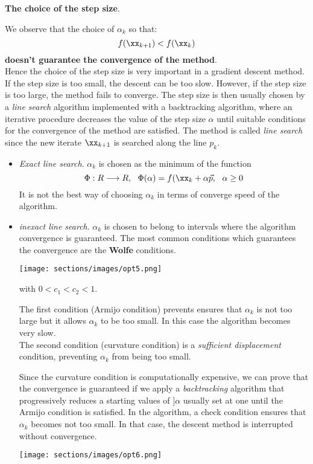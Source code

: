 \textbf{The choice of the step size}.

We observe that the choice of $\alpha_k$ so that:
$$f(\xx_{k+1})<f(\xx_k)$$ 
\textbf{doesn't guarantee the convergence of the method}.\\
Hence the choice of the step size is very important in a gradient descent method. If the step size is too small, the descent can be too slow. However, if the step size is too large, the method fails to converge. The step size is then usually chosen by a \textit{line search} algorithm implemented with a backtracking algorithm, where an iterative procedure decreases the value of the step size $\alpha$ until suitable conditions for the convergence of the method are satisfied. The method is called \textit{line search} since the new iterate $\xx_{k+1}$ is searched along the line $p_k$.

\begin{itemize}
    \item \textit{Exact line search}. $\alpha_k$ is chosen as the minimum of the function
    $$\Phi: R \longrightarrow R, \ \ \Phi(\alpha)=f(\xx_k+\alpha \vec{p}, \ \ \alpha \geq 0$$
    It is not the best way of choosing $\alpha_k$ in terms of converge speed of the algorithm.
    \item \textit{inexact line search}. $\alpha_k$ is chosen to belong to intervals where the algorithm convergence is guaranteed. The most common conditions which guarantees the convergence are the \textbf{Wolfe} conditions. 
    
    \texttt{[image: sections/images/opt5.png]}
    
    with $0<c_1<c_2<1$.
    
    The first condition (Armijo condition) prevents ensures that $\alpha_k$ is not too large but it allows $\alpha_k$ to be too small. In this case the algorithm becomes very slow.\\
    The second condition (curvature condition) is a \textit{sufficient displacement} condition, preventing $\alpha_k$ from being too small.
    
    Since the curvature condition is computationally expensive, we can prove that the convergence is guaranteed if we apply a \textit{backtracking} algorithm that progressively reduces a starting values of $]\alpha$ usually set at one until the Armijo condition is satisfied. In the algorithm, a check condition ensures that $\alpha_k$ becomes not too small. In that case, the descent method is interrupted without convergence.
    
     \texttt{[image: sections/images/opt6.png]}
\end{itemize}



